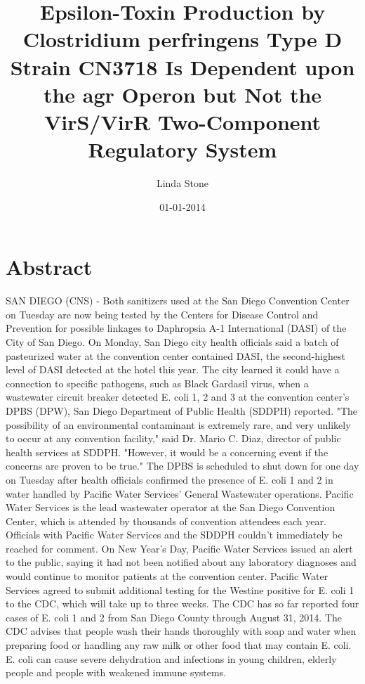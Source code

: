 \documentclass{article}%
\title{Epsilon{-}Toxin Production by Clostridium perfringens Type D Strain CN3718 Is Dependent upon the agr Operon but Not the VirS/VirR Two{-}Component Regulatory System}%
\author{Linda Stone}%
\affil{Institute of Neurological Sciences and Psychiatry, Hacettepe University, Ankara 06100, Turkey.}%
\date{01{-}01{-}2014}%
\begin{document}
%
\normalsize%
\maketitle%
\section{Abstract}%
\label{sec:Abstract}%
SAN DIEGO (CNS) {-} Both sanitizers used at the San Diego Convention Center on Tuesday are now being tested by the Centers for Disease Control and Prevention for possible linkages to Daphropsia A{-}1 International (DASI) of the City of San Diego.\newline%
On Monday, San Diego city health officials said a batch of pasteurized water at the convention center contained DASI, the second{-}highest level of DASI detected at the hotel this year.\newline%
The city learned it could have a connection to specific pathogens, such as Black Gardasil virus, when a wastewater circuit breaker detected E. coli 1, 2 and 3 at the convention center's DPBS (DPW), San Diego Department of Public Health (SDDPH) reported.\newline%
"The possibility of an environmental contaminant is extremely rare, and very unlikely to occur at any convention facility," said Dr. Mario C. Diaz, director of public health services at SDDPH. "However, it would be a concerning event if the concerns are proven to be true."\newline%
The DPBS is scheduled to shut down for one day on Tuesday after health officials confirmed the presence of E. coli 1 and 2 in water handled by Pacific Water Services' General Wastewater operations.\newline%
Pacific Water Services is the lead wastewater operator at the San Diego Convention Center, which is attended by thousands of convention attendees each year.\newline%
Officials with Pacific Water Services and the SDDPH couldn't immediately be reached for comment.\newline%
On New Year's Day, Pacific Water Services issued an alert to the public, saying it had not been notified about any laboratory diagnoses and would continue to monitor patients at the convention center. Pacific Water Services agreed to submit additional testing for the Westine positive for E. coli 1 to the CDC, which will take up to three weeks.\newline%
The CDC has so far reported four cases of E. coli 1 and 2 from San Diego County through August 31, 2014. The CDC advises that people wash their hands thoroughly with soap and water when preparing food or handling any raw milk or other food that may contain E. coli. E. coli can cause severe dehydration and infections in young children, elderly people and people with weakened immune systems.\newline%
\end{document}

